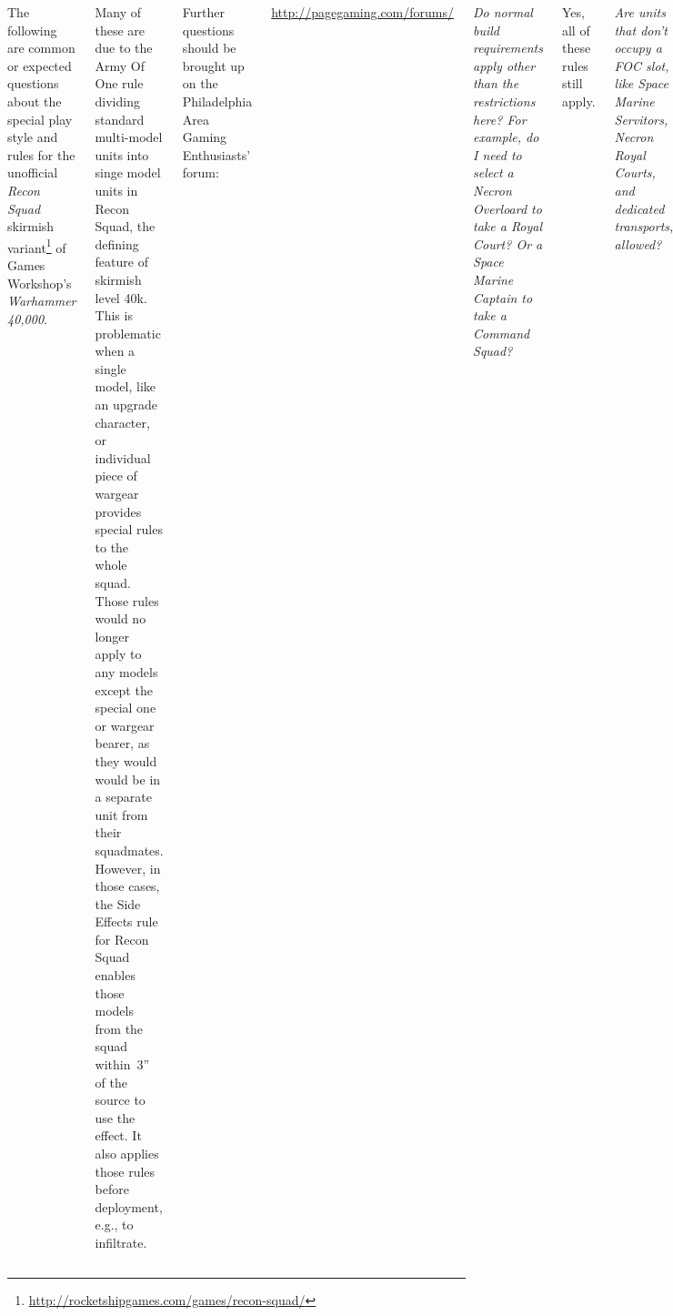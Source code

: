 \documentclass{40k}
\begin{document}
%


\begin{columns}

  The following are common or expected questions about the special
  play style and rules for the unofficial \emph{Recon Squad} skirmish
  variant\footnote{\url{http://rocketshipgames.com/games/recon-squad/}}
  of Games Workshop's \emph{Warhammer 40,000}.


  Many of these are due to the Army Of One rule dividing standard
  multi-model units into singe model units in Recon Squad, the
  defining feature of skirmish level 40k.  This is problematic when a
  single model, like an upgrade character, or individual piece of
  wargear provides special rules to the whole squad.  Those rules
  would no longer apply to any models except the special one or
  wargear bearer, as they would would be in a separate unit from their
  squadmates.  However, in those cases, the Side Effects rule for
  Recon Squad enables those models from the squad within~3'' of the
  source to use the effect.  It also applies those rules before
  deployment, e.g., to infiltrate.

  \bigskip%
  Further questions should be brought up on the Philadelphia Area
  Gaming Enthusiasts' forum:
  \centerline{\url{http://pagegaming.com/forums/}}

%

\smallskip\noindent\emph{Do normal build requirements apply other than
  the restrictions here? For example, do I need to select a Necron
  Overloard to take a Royal Court?  Or a Space Marine Captain to take
  a Command Squad?}

Yes, all of these rules still apply.


\smallskip\noindent\emph{Are units that don't occupy a FOC slot, like
  Space Marine Servitors, Necron Royal Courts, and dedicated
  transports, allowed?}

Yes, following the usual restrictions and rules.


\bigskip{}%

\smallskip\noindent\emph{Does choosing Scout as a specialist trait
  permit the model to be placed into Reserve and then Outflank?}


\end{columns}
\end{document}
